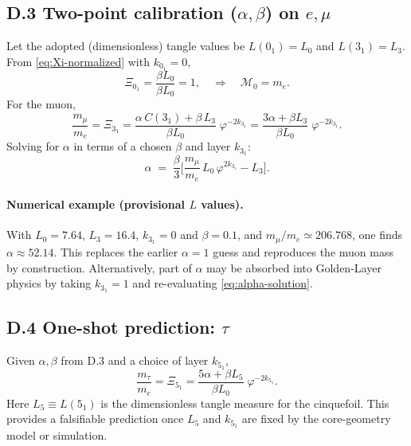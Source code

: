 \subsection*{D.3 Two-point calibration (\texorpdfstring{\(\alpha,\beta\)}{alpha,beta}) on \texorpdfstring{\(e,\mu\)}{e,mu}}
Let the adopted (dimensionless) tangle values be
\(L(0_1)=L_0\) and \(L(3_1)=L_3\).
From \eqref{eq:Xi-normalized} with \(k_{0_1}=0\),
\[
    \Xi_{0_1}=\frac{\beta L_0}{\beta L_0}=1,
    \quad\Rightarrow\quad \mathcal{M}_0=m_e.
\]
For the muon,
\[
    \frac{m_\mu}{m_e}
    = \Xi_{3_1}
    = \frac{\alpha\,C(3_1)+\beta\,L_3}{\beta L_0}\;\varphi^{-2k_{3_1}}
    = \frac{3\alpha+\beta L_3}{\beta L_0}\;\varphi^{-2k_{3_1}}.
\]
Solving for \(\alpha\) in terms of a chosen \(\beta\) and layer \(k_{3_1}\):
\begin{equation}
    \alpha
    \;=\; \frac{\beta}{3}\Bigg[\frac{m_\mu}{m_e}\,L_0\,\varphi^{2k_{3_1}} - L_3\Bigg].
    \label{eq:alpha-solution}
\end{equation}

\paragraph{Numerical example (provisional \(L\) values).}
With \(L_0=7.64\), \(L_3=16.4\), \(k_{3_1}=0\) and \(\beta=0.1\),
and \(m_\mu/m_e\simeq 206.768\),
one finds \(\alpha \approx 52.14\).
This replaces the earlier \(\alpha=1\) guess and reproduces the muon mass by construction.
Alternatively, part of \(\alpha\) may be absorbed into Golden-Layer physics by taking \(k_{3_1}=1\) and re-evaluating \eqref{eq:alpha-solution}.

\subsection*{D.4 One-shot prediction: \texorpdfstring{\(\tau\)}{tau}}
Given \(\alpha,\beta\) from D.3 and a choice of layer \(k_{5_1}\),
\[
    \frac{m_\tau}{m_e}
    = \Xi_{5_1}
    = \frac{5\alpha+\beta L_5}{\beta L_0}\;\varphi^{-2k_{5_1}}.
\]
Here \(L_5\equiv L(5_1)\) is the dimensionless tangle measure for the cinquefoil.
This provides a falsifiable prediction once \(L_5\) and \(k_{5_1}\) are fixed by the core-geometry model or simulation.

